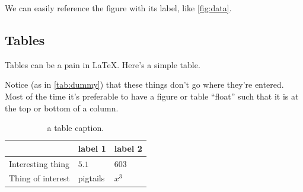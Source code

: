 \documentclass[10pt,twocolumn]{article}
\begin{document}
We can easily reference the figure with its label, like \autoref{fig:data}.

\subsection{Tables}
Tables can be a pain in \LaTeX{}. Here's a simple table.

Notice (as in \autoref{tab:dummy}) that these things don't go where they're entered. Most of the time it's preferable to have a figure or table ``float'' such that it is at the top or bottom of a column.
 
\begin{table}[bt]
	\begin{tabularx}{1\linewidth}{ lXX }
		\hline
		 & \textbf{label 1} & \textbf{label 2} \\
		\hline
		Interesting thing & $5.1$ & $603$ \\
		Thing of interest & pigtails & $x^3$ \\
		\hline
	\end{tabularx}
	\caption{a table caption.}
	\label{tab:dummy}
\end{table}
\end{document}
